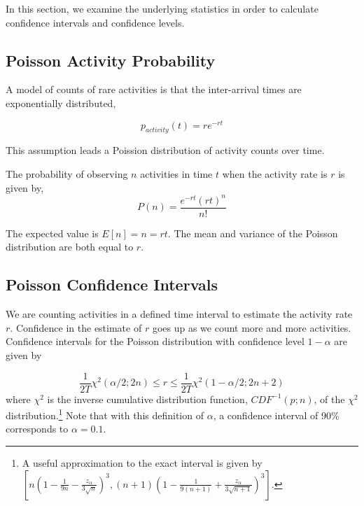 \documentclass{article}
\begin{document}
In this section, we examine the underlying statistics in order to calculate confidence intervals and confidence levels.

\subsection{Poisson Activity Probability} 

A model of counts of rare activities is that the inter-arrival times are exponentially distributed, 

\begin{equation}
    \label{eq:tbe}
    p_{activity}(t) = r e^{-r t}
\end{equation}

This assumption leads a Poission distribution of activity counts over time.

The probability of observing $n$ activities in time $t$ when the activity rate is $r$ is given by,
\begin{equation}
    \label{eq:poisson}
    P(n) = \frac{e^{-r t} (r t)^n}{n!}
\end{equation}

The expected value is $E[n]=n=rt$. The mean and variance of the Poisson distribution are both equal to $r$.

\subsection{Poisson Confidence Intervals} 

We are counting activities in a defined time interval to estimate the activity rate $r$.  Confidence in the estimate of $r$ goes up as we count more and more activities. Confidence intervals for the Poisson distribution with confidence level $1-\alpha$ are given by

\begin{equation}
    \label{eq:chisqconf}
    \frac{1}{2T} \chi^2(\alpha/2;2n) \leq r \leq \frac{1}{2T} \chi^2(1-\alpha/2;2n+2)
\end{equation}
where $\chi^2$ is the inverse cumulative distribution function, $CDF^{-1}(p; n)$, of the $\chi^2$ distribution.\footnote{A useful approximation to the exact interval is given by  $[ n(1 - \frac{1}{9n} - \frac{z_{\alpha}}{3\sqrt{n}})^3 , (n+1)(1- \frac{1}{9(n+1)} + \frac{z_{\alpha}}{3\sqrt{n+1}})^3]$. }
Note that with this definition of $\alpha$, a confidence interval of 90\% corresponds to $\alpha=0.1$.
\end{document}
